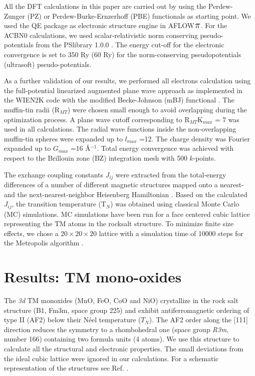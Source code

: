 \documentclass[12pt,a4paper,final]{iopart}
\newcommand{\AFLOWpi}{ {\sf AFLOW$\mathlarger{\mathlarger{\mathlarger{{\pi}}}}$}}
\begin{document}
All the DFT calculations in this paper are carried out by using the Perdew-Zunger (PZ) or Perdew-Burke-Ernzerhoff (PBE) functionals as starting point. We used the QE package \cite{giannozzi2009quantum} as electronic structure engine in  \AFLOWpi. For the ACBN0 calculations, we used scalar-relativistic norm conserving  pseudo-potentials from the PSlibrary 1.0.0 \cite{dal2014pseudopotentials}. The energy cut-off for the electronic convergence is set to 350 Ry (60 Ry) for the norm-conserving pseudopotentials (ultrasoft) pseudo-potentials. 

As a further validation of our results, we performed all electrons calculation using the full-potential linearized augmented plane wave approach as implemented in the WIEN2K code \cite{blaha2001wien2k} with  the modified Becke-Johnson (mBJ) functional \cite{tran2009accurate}. The muffin-tin radii (R$_{MT}$) were chosen small enough to avoid overlapping during the optimization process. A plane wave cutoff corresponding to R$_{MT}$K$_{max}$ = 7 was used in all calculations. The radial wave functions inside the non-overlapping muffin-tin spheres were expanded up to $l_{max}$ =12. The charge density was Fourier expanded up to $G_{max}$ =16 \AA$^{-1}$. Total energy convergence was achieved with respect to the Brillouin zone (BZ) integration mesh with 500 $k$-points. 

The exchange coupling constants $J_{ij}$ were extracted from the total-energy differences of a number of different magnetic structures mapped onto a nearest- and the next-nearest-neighbor Heisenberg Hamiltonian \cite{fischer2009exchange}. Based on the calculated $J_{ij}$, the transition temperature (T$_N$) was obtained using classical Monte Carlo (MC) simulations. 
MC simulations have been run for a face centered cubic lattice representing the TM atoms in the rocksalt structure. To minimize finite size effects, we chose a $20\times20\times20$ lattice with a simulation time of 10000 steps  for the Metropolis algorithm \cite{bhanot1988metropolis}. 


\section{Results: TM  mono-oxides}
\label{sec:resultsTMmono}

The \textit{3d} TM monoxides (MnO, FeO, CoO and NiO) crystallize in the rock salt structure (B1, Fm3m, space group 225) \cite{roth1958magnetic,mehl2016aflow} and exhibit antiferromagnetic ordering of type II (AF2) below their N\'eel temperature ($T_N$). The AF2 order along the [111] direction reduces the symmetry to a rhombohedral one (space group \textit{R3m}, number 166) containing two formula units (4 atoms).  
We use this structure to calculate all the structural and electronic properties. The small deviations from the ideal cubic lattice were ignored in our calculations.  For a schematic representation of the structures see Ref. \cite{anisimov1997first}. 
\end{document}
